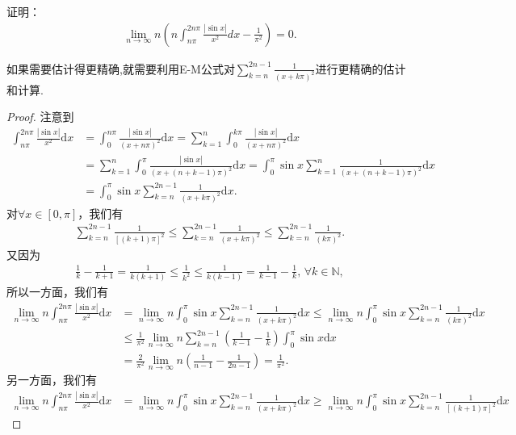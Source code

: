 \documentclass[../../main.tex]{subfiles}
\begin{document}
\begin{example}
证明：
\begin{align*}
\lim_{n \to \infty} n \left( n \int_{n\pi}^{2n\pi} \frac{|\sin x|}{x^2} dx - \frac{1}{\pi^2} \right) = 0.
\end{align*}
\end{example}
\begin{note}
如果需要估计得更精确,就需要利用E-M公式对$\sum_{k=n}^{2n - 1} \frac{1}{(x + k\pi)^2}$进行更精确的估计和计算.
\end{note}
\begin{proof}
注意到
\begin{align*}
\int_{n\pi}^{2n\pi} \frac{|\sin x|}{x^2} \mathrm{d}x &= \int_0^{n\pi} \frac{|\sin x|}{(x + n\pi)^2} \mathrm{d}x = \sum_{k=1}^n \int_0^{k\pi} \frac{|\sin x|}{(x + n\pi)^2} \mathrm{d}x \\
&= \sum_{k=1}^n \int_0^{\pi} \frac{|\sin x|}{(x + (n + k - 1)\pi)^2} \mathrm{d}x = \int_0^{\pi} \sin x \sum_{k=1}^n \frac{1}{(x + (n + k - 1)\pi)^2} \mathrm{d}x \\
&= \int_0^{\pi} \sin x \sum_{k=n}^{2n - 1} \frac{1}{(x + k\pi)^2} \mathrm{d}x.
\end{align*}
对$\forall x \in [0, \pi]$，我们有
\begin{align*}
\sum_{k=n}^{2n - 1} \frac{1}{[(k + 1)\pi]^2} \leq \sum_{k=n}^{2n - 1} \frac{1}{(x + k\pi)^2} \leq \sum_{k=n}^{2n - 1} \frac{1}{(k\pi)^2}.
\end{align*}
又因为
\begin{align*}
\frac{1}{k} - \frac{1}{k + 1} = \frac{1}{k(k + 1)} \leq \frac{1}{k^2} \leq \frac{1}{k(k - 1)} = \frac{1}{k - 1} - \frac{1}{k}, \, \forall k \in \mathbb{N},
\end{align*}
所以一方面，我们有
\begin{align*}
\lim_{n \to \infty} n \int_{n\pi}^{2n\pi} \frac{|\sin x|}{x^2} \mathrm{d}x &= \lim_{n \to \infty} n \int_0^{\pi} \sin x \sum_{k=n}^{2n - 1} \frac{1}{(x + k\pi)^2} \mathrm{d}x \leq \lim_{n \to \infty} n \int_0^{\pi} \sin x \sum_{k=n}^{2n - 1} \frac{1}{(k\pi)^2} \mathrm{d}x \\
&\leq \frac{1}{\pi^2} \lim_{n \to \infty} n \sum_{k=n}^{2n - 1} \left( \frac{1}{k - 1} - \frac{1}{k} \right) \int_0^{\pi} \sin x \mathrm{d}x \\
&= \frac{2}{\pi^2} \lim_{n \to \infty} n \left( \frac{1}{n - 1} - \frac{1}{2n - 1} \right) = \frac{1}{\pi^2}.
\end{align*}
另一方面，我们有
\begin{align*}
\lim_{n \to \infty} n \int_{n\pi}^{2n\pi} \frac{|\sin x|}{x^2} \mathrm{d}x &= \lim_{n \to \infty} n \int_0^{\pi} \sin x \sum_{k=n}^{2n - 1} \frac{1}{(x + k\pi)^2} \mathrm{d}x \geq \lim_{n \to \infty} n \int_0^{\pi} \sin x \sum_{k=n}^{2n - 1} \frac{1}{[(k + 1)\pi]^2} \mathrm{d}x 

\end{align*}
\end{proof}
\end{document}
